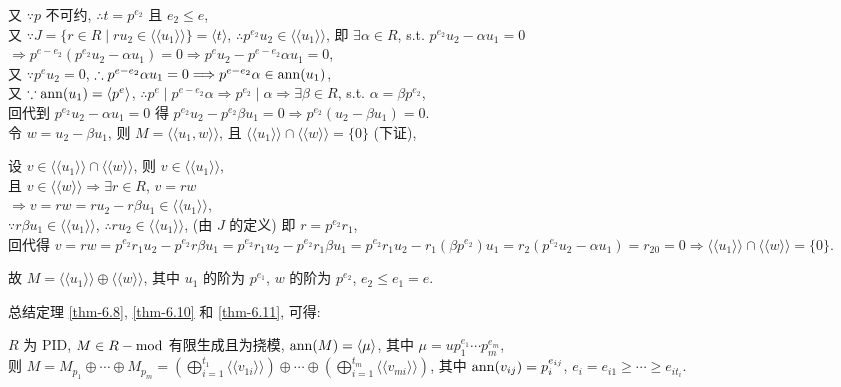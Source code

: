 \documentclass{note}
\begin{document}
\begin{pf}
    又 $\because p$ 不可约, $\therefore t=p^{e_2}$ 且 $e_2\leq e$,\\
    又 $\because J=\{r\in R\mid ru_2\in\langle\langle u_1\rangle\rangle\}=\langle t\rangle$, $\therefore p^{e_2}u_2\in\langle\langle u_1\rangle\rangle$, 即 $\exists\alpha\in R$, s.t. $p^{e_2}u_2-\alpha u_1=0$\\
    $\Longrightarrow p^{e-e_2}(p^{e_2}u_2-\alpha u_1)=0\Longrightarrow p^eu_2-p^{e-e_2}\alpha u_1=0$,\\
    又 $\because p^eu_2=0$, $\therefore p^{e-e_2}\alpha u_1=0\Longrightarrow p^{e-e_2}\alpha\in\operatorname{ann}(u_1)$,\\
    又 $\because\operatorname{ann}(u_1)=\langle p^e\rangle$, $\therefore p^e\mid p^{e-e_2}\alpha\Longrightarrow p^{e_2}\mid\alpha\Longrightarrow\exists\beta\in R$, s.t. $\alpha=\beta p^{e_2}$,\\
    回代到 $p^{e_2}u_2-\alpha u_1=0$ 得 $p^{e_2}u_2-p^{e_2}\beta u_1=0\Longrightarrow p^{e_2}(u_2-\beta u_1)=0$.\\
    令 $w=u_2-\beta u_1$, 则 $M=\langle\langle u_1,w\rangle\rangle$, 且 $\langle\langle u_1\rangle\rangle\cap\langle\langle w\rangle\rangle=\{0\}$ (下证),\\
    \begin{pf}
        设 $v\in\langle\langle u_1\rangle\rangle\cap\langle\langle w\rangle\rangle$, 则 $v\in\langle\langle u_1\rangle\rangle$,\\
        且 $v\in\langle\langle w\rangle\rangle\Longrightarrow\exists r\in R$, $v=rw$\\
        $\Longrightarrow v=rw=ru_2-r\beta u_1\in\langle\langle u_1\rangle\rangle$,\\
        $\because r\beta u_1\in\langle\langle u_1\rangle\rangle$, $\therefore ru_2\in\langle\langle u_1\rangle\rangle$, (由 $J$ 的定义) 即 $r=p^{e_2}r_1$,\\
        回代得 $v=rw=p^{e_2}r_1u_2-p^{e_2}r\beta u_1=p^{e_2}r_1u_2-p^{e_2}r_1\beta u_1=p^{e_2}r_1u_2-r_1(\beta p^{e_2})u_1=r_2(p^{e_2}u_2-\alpha u_1)=r_20=0\Longrightarrow \langle\langle u_1\rangle\rangle\cap\langle\langle w\rangle\rangle=\{0\}$.
    \end{pf}
    故 $M=\langle\langle u_1\rangle\rangle\oplus\langle\langle w\rangle\rangle$, 其中 $u_1$ 的阶为 $p^{e_1}$, $w$ 的阶为 $p^{e_2}$, $e_2\leq e_1=e$.
\end{pf}

总结定理 \ref{thm-6.8}, \ref{thm-6.10} 和 \ref{thm-6.11}, 可得:
\begin{thm}[(课本定理 6.12)]
    $R$ 为 PID, $M\in R-\operatorname{mod}$ 有限生成且为挠模, $\operatorname{ann}(M)=\langle\mu\rangle$, 其中 $\mu=up_1^{e_1}\cdots p_m^{e_m}$,\\
    则 $M=M_{p_1}\oplus\cdots\oplus M_{p_m}=\left(\bigoplus_{i=1}^{t_1}\langle\langle v_{1i}\rangle\rangle\right)\oplus\cdots\oplus\left(\bigoplus_{i=1}^{t_m}\langle\langle v_{mi}\rangle\rangle\right)$, 其中 $\operatorname{ann}(v_{ij})=p_i^{e_{ij}}$, $e_i=e_{i1}\geq\cdots\geq e_{it_i}$.
\end{thm}
\ifx\allfiles\undefined
\end{document}
